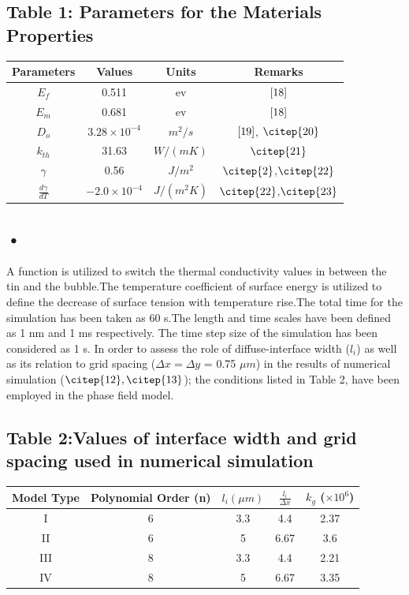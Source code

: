 \documentclass[10pt,a4paper]{article}
\begin{document}
\subsection*{Table 1: Parameters for the Materials Properties}
\begin{tabular}{|c|c|c|c|}
\hline 
Parameters & Values & Units & Remarks  \\ 
\hline 
$E _f$ & 0.511 & ev & $\cite{18}$ \\ 
\hline 
$E _m$  & 0.681 & ev  & $\cite{18}$ \\ 
\hline 
$D_o$ & $3.28 \times 10 ^{-4}$ & $ m^{2}/s $ & $\cite{19}$, $\citep{20}$ \\ 
\hline 
$k_{th}$ & 31.63 & $W/(m K)$ & $\citep{21}$ \\ 
\hline
$\gamma$ & 0.56 & $J/m^{2}$ & $\citep{2}$,$\citep{22}$ \\ 
\hline
$\frac{d\gamma}{dT}$ & $-2.0 \times 10 ^{-4}$ & $J/(m^{2} K)$ & $\citep{22}$,$\citep{23}$ \\ 
\hline
\end{tabular} 

\subsection*{•}
A function is utilized to switch the thermal conductivity values in between the tin and the bubble.The temperature coefficient of surface energy is utilized to define the decrease of surface tension with temperature rise.The total time for the simulation has been taken as 60 s.The length and time scales have been defined as 1 nm and 1 ms respectively. The time step size of the simulation has been considered as 1 s. In order to assess the role of diffuse-interface width ($l_i$) as well as its relation to grid spacing ($\Delta x = \Delta y$ = 0.75 $\mu m$) in the results of numerical simulation ($\citep{12}, \citep{13}$); the conditions listed in Table 2, have been employed in the phase field model.
\subsection*{Table 2:Values of interface width and grid spacing used in numerical simulation}
\begin{tabular}{|c|c|c|c|c|}
\hline
Model Type & Polynomial Order (n) &  $l_i (\mu m)$ & $\frac{l_i}{\Delta x}$ & $k_{g}$ ($\times 10^{6}$) \\
\hline
I & 6 &  3.3 & 4.4 & 2.37 \\
\hline
II & 6 & 5 & 6.67 & 3.6 \\
\hline
III & 8 & 3.3 & 4.4 & 2.21 \\
\hline
IV & 8  & 5 & 6.67 & 3.35 \\
\hline
\end{tabular}
\end{document}
